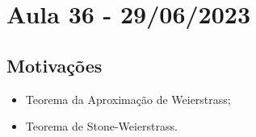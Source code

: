 \documentclass[../analysis_notes.tex]{subfiles}
\begin{document}
\section{Aula 36 - 29/06/2023}
\subsection{Motivações}
\begin{itemize}
	\item Teorema da Aproximação de Weierstrass;
	\item Teorema de Stone-Weierstrass.
\end{itemize}
\end{document}
